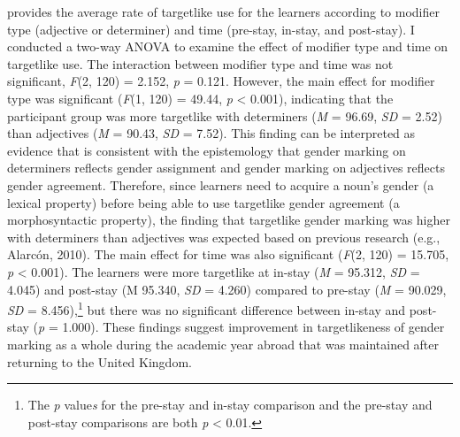\documentclass[output=paper,colorlinks,citecolor=brown,modfonts,nonflat]{../langscibook}
\begin{document}
 provides the average rate of targetlike use for the learners according to modifier type (adjective or determiner) and time (pre-stay, in-stay, and post-stay). I conducted a two-way ANOVA to examine the effect of modifier type and time on targetlike use. The interaction between modifier type and time was not significant, \textit{F}(2, 120) = 2.152, \textit{p} = 0.121. However, the main effect for modifier type was significant (\textit{F}(1, 120) = 49.44, \textit{p} < 0.001), indicating that the participant group was more targetlike with determiners (\textit{M} = 96.69, \textit{SD} = 2.52) than adjectives (\textit{M} = 90.43, \textit{SD} = 7.52).  This finding can be interpreted as evidence that is consistent with the epistemology that gender marking on determiners reflects gender assignment and gender marking on adjectives reflects gender agreement. Therefore, since learners need to acquire a noun’s gender (a lexical property) before being able to use targetlike gender agreement (a morphosyntactic property), the finding that targetlike gender marking was higher with determiners than adjectives was expected based on previous research (e.g., Alarcón, 2010). The main effect for time was also significant (\textit{F}(2, 120) = 15.705, \textit{p} < 0.001). The learners were more targetlike at in-stay (\textit{M} = 95.312, \textit{SD} = 4.045) and post-stay (M 95.340, \textit{SD} = 4.260) compared to pre-stay (\textit{M} = 90.029, \textit{SD} = 8.456),\footnote{{The} {\textit{p} }{value}{\textit{s} }{for the pre-stay and in-stay comparison and the pre-stay and post-stay comparisons are both} {\textit{p}} {< 0.01.}} but there was no significant difference between in-stay and post-stay (\textit{p} = 1.000). These findings suggest improvement in targetlikeness of gender marking as a whole during the academic year abroad that was maintained after returning to the United Kingdom.


\begin{table}
\caption{Rates of targetlike use (in percentages)\label{tab:gudmestad:2}}
\end{table}
\end{document}
